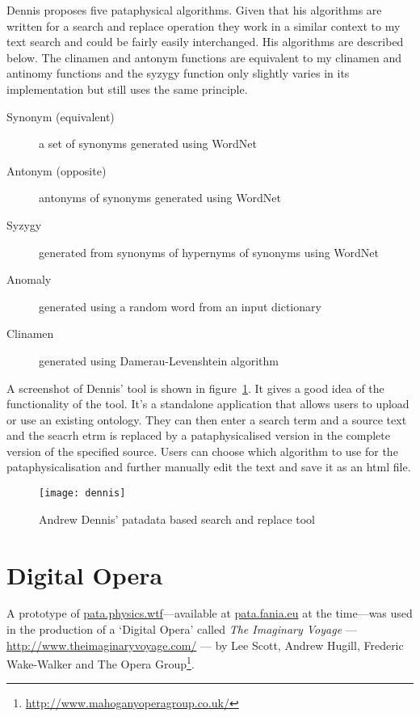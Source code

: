 Dennis proposes five pataphysical algorithms. Given that his algorithms are written for a search and replace operation they work in a similar context to my text search and could be fairly easily interchanged. His algorithms are described below. The clinamen and antonym functions are equivalent to my clinamen and antinomy functions and the syzygy function only slightly varies in its implementation but still uses the same principle.

\begin{description}
  \item[Synonym (equivalent)] a set of synonyms generated using WordNet
  \item[Antonym (opposite)] antonyms of synonyms generated using WordNet
  \item[Syzygy] generated from synonyms of hypernyms of synonyms using WordNet
  \item[Anomaly] generated using a random word from an input dictionary
  \item[Clinamen] generated using Damerau-Levenshtein algorithm
\end{description}

A screenshot of Dennis' tool is shown in figure~\ref{fig:dennis}. It gives a good idea of the functionality of the tool. It's a standalone application that allows users to upload or use an existing ontology. They can then enter a search term and a source text and the seacrh etrm is replaced by a pataphysicalised version in the complete version of the specified source. Users can choose which algorithm to use for the pataphysicalisation and further manually edit the text and save it as an \gls{html} file.

\begin{figure}[h!]
  \centering
  \texttt{[image: dennis]}
\caption[Andrew Dennis' Search and Replace]{Andrew Dennis' patadata based search and replace tool}
\label{fig:dennis}
\end{figure}



\section{Digital Opera}

A prototype of \url{pata.physics.wtf}---available at \url{pata.fania.eu} at the time---was used in the production of a `Digital Opera' called \emph{The Imaginary Voyage} --- \url{http://www.theimaginaryvoyage.com/} --- by Lee Scott, Andrew Hugill, Frederic Wake-Walker and The Opera Group\footnote{\url{http://www.mahoganyoperagroup.co.uk/}}.

